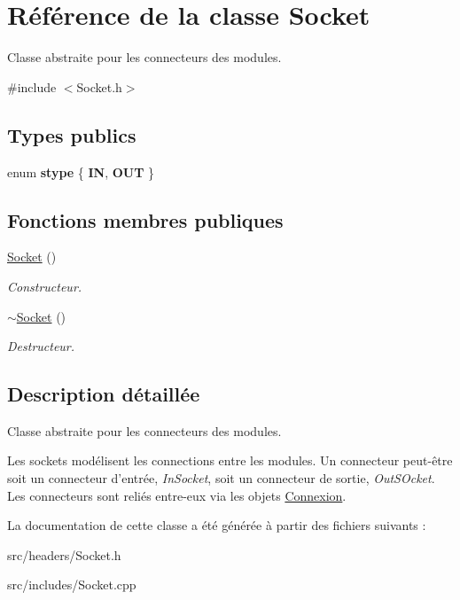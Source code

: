 \hypertarget{classSocket}{\section{Référence de la classe Socket}
\label{classSocket}
}


Classe abstraite pour les connecteurs des modules.  




{\ttfamily \#include $<$Socket.\-h$>$}

\subsection*{Types publics}
\begin{DoxyCompactItemize}
\item 
enum {\bfseries stype} \{ {\bfseries I\-N}, 
{\bfseries O\-U\-T}
 \}
\end{DoxyCompactItemize}
\subsection*{Fonctions membres publiques}
\begin{DoxyCompactItemize}
\item 
\hypertarget{classSocket_a7c3256c4fc6e2c603df73201049fae5a}{\hyperlink{classSocket_a7c3256c4fc6e2c603df73201049fae5a}{Socket} ()}\label{classSocket_a7c3256c4fc6e2c603df73201049fae5a}

\begin{DoxyCompactList}\small\item\em Constructeur. \end{DoxyCompactList}\item 
\hypertarget{classSocket_aeac4eb6379a543d38ed88977d3b6630a}{\hyperlink{classSocket_aeac4eb6379a543d38ed88977d3b6630a}{$\sim$\-Socket} ()}\label{classSocket_aeac4eb6379a543d38ed88977d3b6630a}

\begin{DoxyCompactList}\small\item\em Destructeur. \end{DoxyCompactList}\end{DoxyCompactItemize}


\subsection{Description détaillée}
Classe abstraite pour les connecteurs des modules. 

Les sockets modélisent les connections entre les modules. Un connecteur peut-\/être soit un connecteur d'entrée, {\itshape In\-Socket}, soit un connecteur de sortie, {\itshape Out\-S\-Ocket}. Les connecteurs sont reliés entre-\/eux via les objets \hyperlink{classConnexion}{Connexion}. 

La documentation de cette classe a été générée à partir des fichiers suivants \-:\begin{DoxyCompactItemize}
\item 
src/headers/Socket.\-h\item 
src/includes/Socket.\-cpp\end{DoxyCompactItemize}
